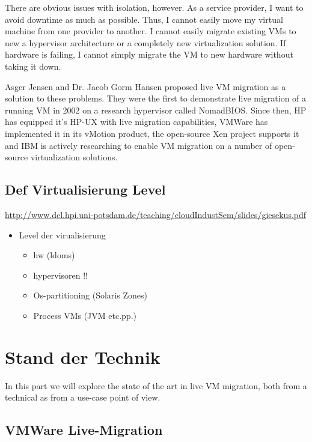 \documentclass[draft,journal]{IEEEtran}
\begin{document}
There are obvious issues with isolation, however. As a service
provider, I want to avoid downtime as much as possible. Thus, I cannot
easily move my virtual machine from one provider to another. I cannot
easily migrate existing VMs to new a hypervisor architecture or a
completely new virtualization solution. If hardware is failing, I
cannot simply migrate the VM to new hardware without taking it down.

Asger Jensen and Dr. Jacob Gorm Hansen proposed live VM migration as a
solution to these problems. They were the first to demonstrate live
migration of a running VM in 2002 on a research hypervisor called
NomadBIOS. Since then, HP has equipped it's HP-UX with live migration
capabilities, VMWare has implemented it in its vMotion product, the
open-source Xen project supports it and IBM is actively researching to
enable VM migration on a number of open-source virtualization
solutions.


\subsection{Def Virtualisierung Level}
\label{sec:def-virtualisierung}

\url{http://www.dcl.hpi.uni-potsdam.de/teaching/cloudIndustSem/slides/giesekus.pdf}
\begin{itemize}
\item Level der virualisierung
  \begin{itemize}
  \item hw (ldoms)
  \item hypervisoren !!
  \item Os-partitioning (Solaris Zones)
  \item Process VMs (JVM etc.pp.)
  \end{itemize}
\end{itemize}


\section{Stand der Technik}
\label{sec:sota}

In this part we will explore the state of the art in live VM
migration, both from a technical as from a use-case point of view.

\subsection{VMWare Live-Migration}
\label{sec:livemigration}
\end{document}
